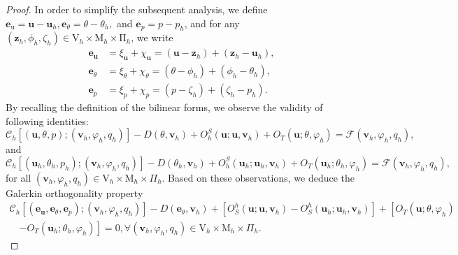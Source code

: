 \documentclass[10pt,a4paper]{amsart}
\begin{document}
  		\begin{proof}
  			In order to simplify the subsequent analysis, we define $\boldsymbol{e}_{\mathrm{u}} = \boldsymbol{u}-\boldsymbol{u}_h, \boldsymbol{e}_{\theta} = \theta -\theta_h,$ and  $\boldsymbol{e}_p = p - p_h$, and for any $\left( \boldsymbol{z}_h, \phi_h, \zeta_h \right) \in \mathrm{V}_h \times \mathrm{M}_h \times \mathrm{\Pi}_h $, we write
  			\begin{align}\label{error_d}
  			\boldsymbol{e}_{\boldsymbol{u}}&=\xi_{\boldsymbol{u}}+\chi_{\boldsymbol{u}}=\left(\boldsymbol{u}-\boldsymbol{z}_h\right)+\left(\boldsymbol{z}_h-\boldsymbol{u}_h\right), \nonumber \\
            \boldsymbol{e}_{\theta}&=\xi_{\theta}+\chi_{\theta}=\left(\theta -\phi_h\right)+\left(\phi_h-\theta _h\right), 
            \\   \boldsymbol{e}_p&=\xi_p+\chi_p=\left(p-\zeta_h\right)+\left(\zeta_h-p_h\right) \nonumber .
  			\end{align}
  			By recalling the definition of the bilinear forms, we observe the validity of following identities:
  			$$
  			\mathcal{C}_h\left[( \boldsymbol{u},\theta,p);(\boldsymbol{v}_h,\varphi_h,q_h)\right] - D(\theta, \boldsymbol{v}_h)+O_h^S(\boldsymbol{u} ; \boldsymbol{u}, \boldsymbol{v}_h) +O_T( \boldsymbol{u}; \theta, \varphi_h)= \mathcal{F}(\boldsymbol{v}_h, \varphi_h, q_h),
  			$$
  			and
  			$$
  			\mathcal{C}_h\left[( \boldsymbol{u}_h,\theta_h,p_h);(\boldsymbol{v}_h,\varphi_h,q_h)\right] - D(\theta_h, \boldsymbol{v}_h)+O_h^S(\boldsymbol{u}_h ; \boldsymbol{u}_h, \boldsymbol{v}_h) +O_T( \boldsymbol{u}_h; \theta_h, \varphi_h)= \mathcal{F}(\boldsymbol{v}_h, \varphi_h, q_h), 
  			$$
  			for all $(\boldsymbol{v}_h,\varphi_h,q_h) \in \mathrm{V}_h \times \mathrm{M}_h \times \Pi_h$. Based on these observations, we deduce the Galerkin orthogonality property
     \begin{align}\label{galerkin_ortho}
\mathcal{C}_h\left[(\boldsymbol{e}_{\boldsymbol{u}}, \boldsymbol{e}_{\theta}, \boldsymbol{e}_p);( \boldsymbol{v}_h, \varphi_h, q_h)\right]  - D (\boldsymbol{e}_{\theta}, \boldsymbol{v}_h) + \left[O_S^h\left(\boldsymbol{u}; \boldsymbol{u}, \boldsymbol{v}_h \right) -O_
S^h \left(\boldsymbol{u}_h; \boldsymbol{u}_h, \boldsymbol{v}_h \right)\right] + \left[O_T\left(\boldsymbol{u}; \theta , \varphi_h \right) \nonumber \right. \\ \quad \left.  - O_T \left(\boldsymbol{u}_h; \theta_h, \varphi_h \right)\right] = 0,  \forall \left( \boldsymbol{v}_h, \varphi_h, q_h \right) \in \mathrm{V}_h \times \mathrm{M}_h \times {\Pi}_h.

\end{align}
\end{proof}
\end{document}
